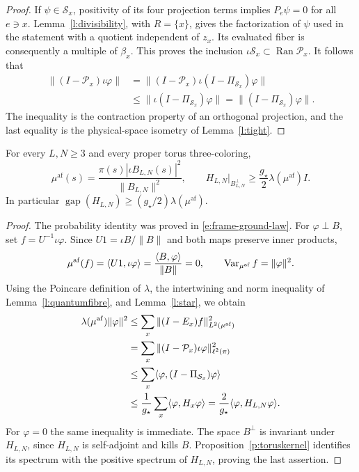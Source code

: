 \begin{proof}
If \(\psi\in\mathcal S_x\), positivity of its four projection
terms implies \(P_e\psi=0\) for all \(e\ni x\).
Lemma~\ref{l:divisibility}, with \(R=\{x\}\), gives the
factorization of \(\psi\) used in the statement with a quotient
independent of \(z_x\). Its evaluated fiber is consequently a
multiple of \(\beta_x\). This proves the inclusion
\(\iota\mathcal S_x\subset\operatorname{Ran}\mathcal P_x\).
It follows that
\[
 \begin{split}
 \|(I-\mathcal P_x)\iota\varphi\|
 &=\|(I-\mathcal P_x)\iota(I-\Pi_{\mathcal S_x})\varphi\|\\
 &\le\|\iota(I-\Pi_{\mathcal S_x})\varphi\|
  =\|(I-\Pi_{\mathcal S_x})\varphi\|.
 \end{split}
\]
The inequality is the contraction property of an orthogonal
projection, and the last equality is the physical-space isometry
of Lemma~\ref{l:tight}.
\end{proof}

\begin{theorem}\label{t:QD}
For every \(L,N\ge3\) and every proper torus three-coloring,
\[
 \mu^{\mathrm{af}}(s)=
 \frac{\pi(s)|\iota B_{L,N}(s)|^2}{\|B_{L,N}\|^2},\qquad
 H_{L,N}\big|_{B_{L,N}^{\perp}}\ge
       \frac{g_\star}{2}\lambda(\mu^{\mathrm{af}})I .
\]
In particular
\(\operatorname{gap}(H_{L,N})\ge(g_\star/2)\lambda(\mu^{\mathrm{af}})\).
\end{theorem}

\begin{proof}
The probability identity was proved in
\eqref{e:frame-ground-law}. For \(\varphi\perp B\), set
\(f=U^{-1}\iota\varphi\). Since
\(U1=\iota B/\|B\|\) and both maps preserve inner products,
\[
 \mu^{\rm af}(f)
 =\langle U1,\iota\varphi\rangle
 =\frac{\langle B,\varphi\rangle}{\|B\|}=0,\qquad
 \operatorname{Var}_{\mu^{\rm af}}f=\|\varphi\|^2.
\]
Using the Poincare definition of \(\lambda\), the intertwining
and norm inequality of Lemma~\ref{l:quantumfibre}, and
Lemma~\ref{l:star}, we obtain
\[
 \begin{split}
 \lambda(\mu^{\rm af})\|\varphi\|^2
 &\le\sum_x\|(I-E_x)f\|_{L^2(\mu^{\rm af})}^2\\
 &=\sum_x\|(I-\mathcal P_x)\iota\varphi\|_{\ell^2(\pi)}^2\\
 &\le\sum_x\langle\varphi,(I-\Pi_{\mathcal S_x})\varphi\rangle\\
 &\le\frac1{g_\star}\sum_x\langle\varphi,H_x\varphi\rangle
  =\frac2{g_\star}\langle\varphi,H_{L,N}\varphi\rangle.
 \end{split}
\]
For \(\varphi=0\) the same inequality is immediate.
The space \(B^\perp\) is invariant under \(H_{L,N}\), since
\(H_{L,N}\) is self-adjoint and kills \(B\).
Proposition~\ref{p:toruskernel} identifies its spectrum with the
positive spectrum of \(H_{L,N}\), proving the last assertion.
\end{proof}

